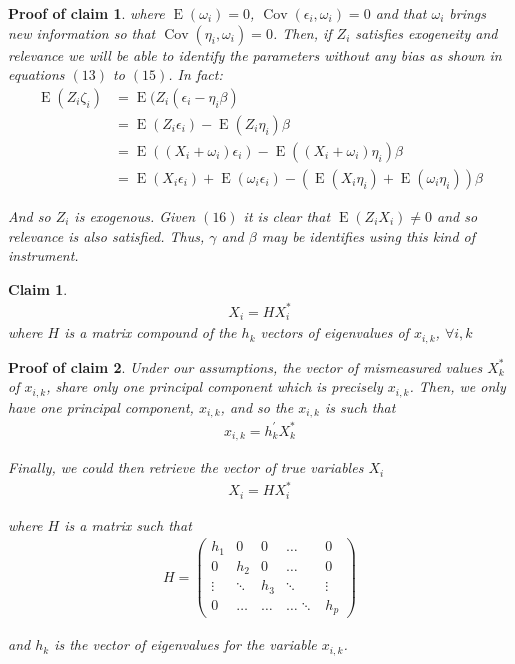 \documentclass[10pt]{article}
\newtheorem{claim}{Claim}
\newtheorem{claimproof}{Proof of claim}[claim]
\def\b{\beta}
\begin{document}
\begin{claimproof}
        where $\operatorname{E}(\omega_i)=0$, $\operatorname{Cov}(\epsilon_i,\omega_i)=0$ and that $\omega_i$ brings new information so that $\operatorname{Cov}(\eta_i,\omega_i)=0$. Then, if $Z_i$ satisfies exogeneity and relevance we will be able to identify the parameters without any bias as shown in equations $(13)$ to $(15)$. In fact:
        \begin{align}
            \operatorname{E}(Z_i\zeta_i)&=\operatorname{E}(Z_i(\epsilon_i-\eta_i\b)\\
            &=\operatorname{E}(Z_i\epsilon_i)-\operatorname{E}(Z_i\eta_i)\b\\
           &= \operatorname{E}((X_i+\omega_i)\epsilon_i)-\operatorname{E}((X_i+\omega_i)\eta_i)\b \\
           &=\operatorname{E}(X_i\epsilon_i) + \operatorname{E}(\omega_i\epsilon_i)-(\operatorname{E}(X_i\eta_i)+\operatorname{E}(\omega_i\eta_i))\b
        \end{align}
        
        And so $Z_i$ is exogenous. Given $(16)$ it is clear that $\operatorname{E}(Z_iX_i)\neq0$ and so relevance is also satisfied. Thus, $\gamma$ and $\b$ may be identifies using this kind of instrument.

\end{claimproof}

\begin{claim}
\begin{align}
            X_i=HX^*_i
        \end{align}
where $H$ is a matrix compound of the $h_k$ vectors of eigenvalues of $x_{i,k}$, $\forall i,k$
\end{claim}

\begin{claimproof}
Under our assumptions, the vector of mismeasured values $X^*_k$ of $x_{i,k}$, share only one principal component which is precisely $x_{i,k}$. Then, we only have one principal component, $x_{i,k}$, and so the $x_{i,k}$ is such that
        \begin{align}
            x_{i,k}=h_{k}^{\prime} X^*_k
        \end{align}
        
        Finally, we could then retrieve the vector of true variables $X_i$
        \begin{align}
            X_i=HX^*_i
        \end{align}
        
        where $H$ is a matrix such that
        \begin{align*}
            H=\left(\begin{array}{ccccc}
        h_1 & 0 & 0 & \dots & 0 \\
        0 & h_2 & 0 & \dots & 0 \\
        \vdots & \ddots & h_3 & \ddots & \vdots \\
        0 & \dots & \dots & \dots \ddots & h_p
        \end{array}\right)
        \end{align*}
        
        and $h_k$ is the vector of eigenvalues for the variable $x_{i,k}$.
\end{claimproof}
\end{document}
